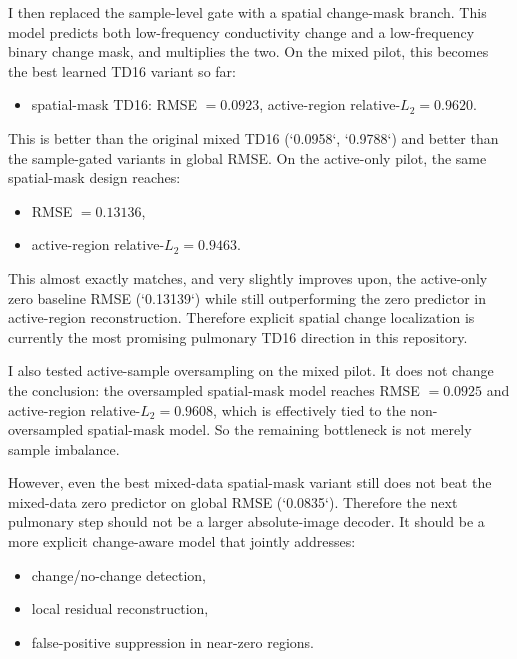 \documentclass[11pt,a4paper]{article}
\begin{document}
I then replaced the sample-level gate with a spatial change-mask branch. This
model predicts both low-frequency conductivity change and a low-frequency binary
change mask, and multiplies the two. On the mixed pilot, this becomes the best
learned TD16 variant so far:
\begin{itemize}[leftmargin=1.5em]
    \item spatial-mask TD16: RMSE $= 0.0923$, active-region relative-$L_2 = 0.9620$.
\end{itemize}

This is better than the original mixed TD16 (`0.0958`, `0.9788`) and better
than the sample-gated variants in global RMSE. On the active-only pilot, the
same spatial-mask design reaches:
\begin{itemize}[leftmargin=1.5em]
    \item RMSE $= 0.13136$,
    \item active-region relative-$L_2 = 0.9463$.
\end{itemize}

This almost exactly matches, and very slightly improves upon, the active-only
zero baseline RMSE (`0.13139`) while still outperforming the zero predictor in
active-region reconstruction. Therefore explicit spatial change localization is
currently the most promising pulmonary TD16 direction in this repository.

I also tested active-sample oversampling on the mixed pilot. It does not change
the conclusion: the oversampled spatial-mask model reaches RMSE $= 0.0925$ and
active-region relative-$L_2 = 0.9608$, which is effectively tied to the
non-oversampled spatial-mask model. So the remaining bottleneck is not merely
sample imbalance.

However, even the best mixed-data spatial-mask variant still does not beat the
mixed-data zero predictor on global RMSE (`0.0835`). Therefore the next
pulmonary step should not be a larger absolute-image decoder. It should be a
more explicit change-aware model that jointly addresses:
\begin{itemize}[leftmargin=1.5em]
    \item change/no-change detection,
    \item local residual reconstruction,
    \item false-positive suppression in near-zero regions.
\end{itemize}
\end{document}

